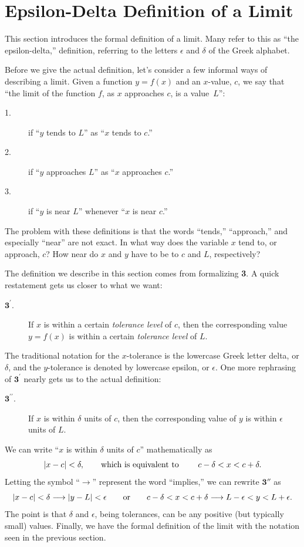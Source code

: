 \section{Epsilon-Delta Definition of a Limit}\label{sec:limit_def}

This section introduces the formal definition of a limit. Many refer to this as ``the epsilon-delta,'' definition, referring to the letters $\epsilon$ and $\delta$ of the Greek alphabet.\bigskip

Before we give the actual definition, let's consider a few informal ways of describing a limit.  Given a function $y=f(x)$ and an $x$-value, $c$, we say that ``the limit of the function $f$, as $x$ approaches $c$, is a value~$L$'':
\begin{description}
\item[1.]if ``$y$ tends to $L$'' as ``$x$ tends to $c$.''
\item[2.]if ``$y$ approaches $L$'' as ``$x$ approaches $c$.''
\item[3.]if ``$y$ is near $L$'' whenever ``$x$ is near $c$.''
\end{description}

The problem with these definitions is that the words ``tends,'' ``approach,'' and especially ``near'' are not exact.  In what way does the variable $x$ tend to, or approach, $c$? How near do $x$ and $y$ have to be to $c$ and $L$, respectively?\bigskip

The definition we describe in this section comes from formalizing \textbf{3}.  A quick restatement gets us closer to what we want:
\begin{description}
\item[$\textbf{3}^\prime$.]If $x$ is within a certain \emph{tolerance level} of $c$, then the corresponding value $y=f(x)$ is within a certain \emph{tolerance level} of $L$.
\end{description}

The traditional notation for the $x$-tolerance is the lowercase Greek letter delta, or $\delta$, and the $y$-tolerance is denoted by lowercase epsilon, or $\epsilon$. One more rephrasing of $\textbf{3}^\prime$ nearly gets us to the actual definition:
\begin{description}
\item[$\textbf{3}^{\prime \prime}$.]If $x$ is within $\delta$ units of $c$, then the corresponding value of $y$ is within $\epsilon$ units of $L$.
\end{description}

We can write ``$x$ is within $\delta$ units of $c$'' mathematically as
\[\left\lvert x-c \right\rvert < \delta, \qquad \text{which is equivalent to }\qquad c-\delta < x < c+\delta.\]
Letting the symbol ``$\longrightarrow$'' represent the word ``implies,'' we can rewrite $\textbf{3}''$ as 
\[
\left\lvert x - c \right\rvert < \delta \longrightarrow  \left\lvert y - L \right\rvert < \epsilon 
\qquad \textrm{or} \qquad c - \delta < x < c + \delta \longrightarrow L - \epsilon < y < L + \epsilon.
\]
The point is that $\delta$ and $\epsilon$, being tolerances, can be any positive (but typically small) values.  Finally, we have the formal definition of the limit with the notation  seen in the previous section.


